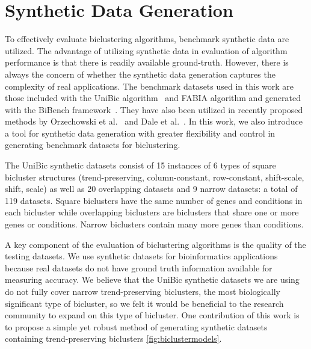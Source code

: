 
\section{Synthetic Data Generation}

To effectively evaluate biclustering algorithms, benchmark synthetic data are utilized.
The advantage of utilizing synthetic data in evaluation of algorithm performance is that there is readily available ground-truth.
However, there is always the concern of whether the synthetic data generation captures the complexity of real applications.
The benchmark datasets used in this work are those included with the UniBic algorithm~\cite{wang2016unibic} and FABIA algorithm\cite{hochreiter2010fabia} and generated with the BiBench framework~\cite{eren2012comparative}.
They have also been utilized in recently proposed methods by Orzechowski et al.~\cite{orzechowski2018ebic} and Dale et al.~\cite{icpram18}.
In this work, we also introduce a tool for synthetic data generation with greater flexibility and control in generating benchmark datasets for biclustering.

The UniBic synthetic datasets consist of 15 instances of 6 types of square bicluster structures (trend-preserving, column-constant, row-constant, shift-scale, shift, scale) as well as 20 overlapping datasets and 9 narrow datasets: a total of 119 datasets. Square biclusters have the same number of genes and conditions in each bicluster while overlapping biclusters are biclusters that share one or more genes or conditions. Narrow biclusters contain many more genes than conditions.



A key component of the evaluation of biclustering algorithms is the quality of the testing datasets.
We use synthetic datasets for bioinformatics applications because real datasets do not have ground truth information available for measuring accuracy.
We believe that the UniBic synthetic datasets we are using do not fully cover narrow trend-preserving biclusters, the most biologically significant type of bicluster, so we felt it would be beneficial to the research community to expand on this type of bicluster.
One contribution of this work is to propose a simple yet robust method of generating synthetic datasets containing trend-preserving biclusters \ref{fig:biclustermodels}.

